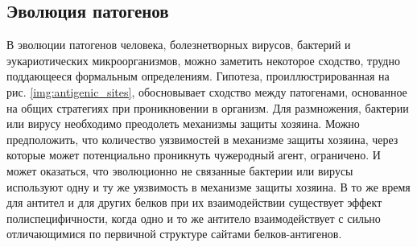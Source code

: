 \subsection{Эволюция патогенов} \label{sect_pathogenevolution}

В эволюции патогенов человека, болезнетворных вирусов, бактерий и эукариотических микроорганизмов, можно заметить некоторое сходство, трудно поддающееся формальным определениям. Гипотеза, проиллюстрированная на рис. \ref{img:antigenic_sites}, обосновывает сходство между патогенами, основанное на общих стратегиях при проникновении в организм. Для размножения, бактерии или вирусу необходимо преодолеть механизмы защиты хозяина. Можно предположить, что количество уязвимостей в механизме защиты хозяина, через которые может потенциально проникнуть чужеродный агент, ограничено. И может оказаться, что эволюционно не связанные бактерии или вирусы используют одну и ту же уязвимость в механизме защиты хозяина. В то же время для антител и для других белков при их взаимодействии существует эффект полиспецифичности, когда одно и то же антитело взаимодействует с сильно отличающимися по первичной структуре сайтами белков-антигенов.





